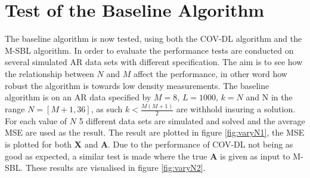 \section{Test of the Baseline Algorithm}\label{sec:test_base}

  

The baseline algorithm is now tested, using both the COV-DL algorithm and the M-SBL algorithm. In order to evaluate the performance tests are conducted on several simulated AR data sets with different specification. The aim is to see how the relationship between $N$ and $M$ affect the performance, in other word how robust the algorithm is towards low density measurements. 
The baseline algorithm is on an AR data specified by $M=8$, $L=1000$, $k=N$ and N in the range $N = [M+1, 36]$, as such $k<\frac{M(M+1)}{2}$ are withhold insuring a solution.
For each value of $N$ 5 different data sets are simulated and solved and the average MSE are used as the result. The result are plotted in figure \ref{fig:varyN1}, the MSE is plotted for both $\textbf{X}$ and $\textbf{A}$. 
Due to the performance of COV-DL not being as good as expected, a similar test is made where the true $\textbf{A}$ is given as input to M-SBL. These results are visualised in figure \ref{fig:varyN2}.    
      
